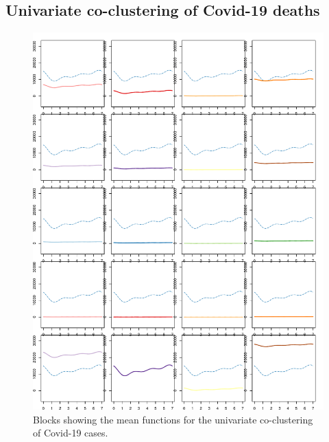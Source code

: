 \documentclass[12pt,a4paper]{article}
\begin{document}
\subsection{Univariate co-clustering of Covid-19 deaths}
\begin{figure}[H]
	\begin{center}
		\includegraphics[width=\columnwidth]{Deaths_blocks.pdf}
		\caption{Blocks showing the mean functions for the univariate co-clustering of Covid-19 cases.}
		\label{fig6}
	\end{center}
\end{figure}
\end{document}
